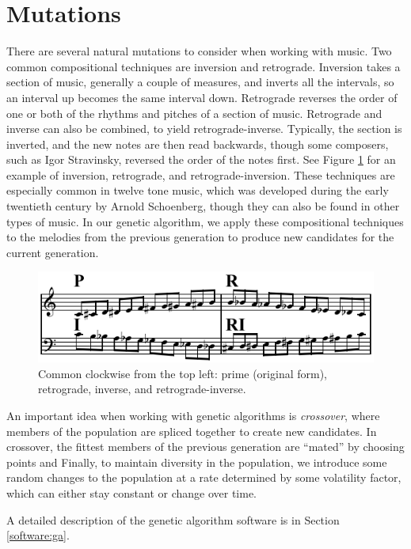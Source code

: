 \section{Mutations} \label{ga:mutate}

There are several natural mutations to consider when working with music.
Two common compositional techniques are inversion and retrograde.
Inversion takes a section of music, generally a couple of measures, and inverts all the intervals, so an interval up becomes the same interval down.
Retrograde reverses the order of one or both of the rhythms and pitches of a section of music.
Retrograde and inverse can also be combined, to yield retrograde-inverse.
Typically, the section is inverted, and the new notes are then read backwards, though some composers, such as Igor Stravinsky, reversed the order of the notes first.
See Figure \ref{fig:p-r-i-ri} for an example of inversion, retrograde, and retrograde-inversion.
These techniques are especially common in twelve tone music, which was developed during the early twentieth century by Arnold Schoenberg, though they can also be found in other types of music. %
In our genetic algorithm, we apply these compositional techniques to the melodies from the previous generation to produce new candidates for the current generation.

\begin{figure}
	\centering
	\includegraphics[width=\linewidth]{figures/P-R-I-RI.png} %
	\caption{Common  clockwise from the top left: prime (original form), retrograde, inverse, and retrograde-inverse.}
	\label{fig:p-r-i-ri}
\end{figure}

An important idea when working with genetic algorithms is \textit{crossover}, where members of the population are spliced together to create new candidates.
In crossover, the fittest members of the previous generation are ``mated'' by choosing points and 
Finally, to maintain diversity in the population, we introduce some random changes to the population at a rate determined by some volatility factor, which can either stay constant or change over time.



A detailed description of the genetic algorithm software is in Section \ref{software:ga}.